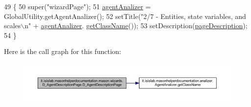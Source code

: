\begin{DoxyCode}
49                                     \{
50         super(\textcolor{stringliteral}{"wizardPage"});
51         \hyperlink{classit_1_1isislab_1_1masonhelperdocumentation_1_1mason_1_1wizards_1_1_d___agent_description_page_a2a9e05cc43fedb16d75050620d30f712}{agentAnalizer} = GlobalUtility.getAgentAnalizer();
52         setTitle(\textcolor{stringliteral}{"2/7 - Entities, state variables, and scales\(\backslash\)n"} + \hyperlink{classit_1_1isislab_1_1masonhelperdocumentation_1_1mason_1_1wizards_1_1_d___agent_description_page_a2a9e05cc43fedb16d75050620d30f712}{agentAnalizer}.
      \hyperlink{classit_1_1isislab_1_1masonhelperdocumentation_1_1analizer_1_1_agent_analizer_ace466e16439878a851eb63d5a11ddf43}{getClassName}());
53         setDescription(\hyperlink{classit_1_1isislab_1_1masonhelperdocumentation_1_1mason_1_1wizards_1_1_d___agent_description_page_a8ba359bbeadb34933a78f865581fdf15}{pageDescription});
54     \}
\end{DoxyCode}


Here is the call graph for this function\-:
\nopagebreak
\begin{figure}[H]
\begin{center}
\leavevmode
\includegraphics[width=350pt]{classit_1_1isislab_1_1masonhelperdocumentation_1_1mason_1_1wizards_1_1_d___agent_description_page_a16a7daf2bc98cdfde170aa29c028ba06_cgraph}
\end{center}
\end{figure}




